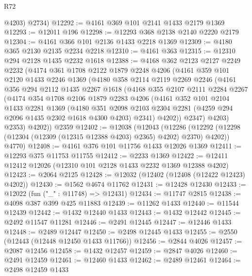 \begin{lexlean}{R72}
\begin{coremodule}
        @4203)
      @2734)
@12292 := @4161 @369 @101 @2141 @1433 @2179 @1369
@12293 := @12011 @196
@12298 := @12293 @368 @2138 @2140 @2220 @2179
@12304 := @4161 @366 @101 @2136 @1433 @2218 @1369
@12309 := @4180 @365 @2130 @2135 @2234 @2218
@12310 := @4161 @363
@12315 := @12310 @294 @2128 @1435 @2232 @1618
@12388 := @4168
    @362
    @2123
    @2127
    @2249
    @2232
    (@4174
      @361
      @1708
      @2122
      @1879
      @2248
      @4206
      (@4161
        @359
        @101
        @2120
        @1433
        @2246
        @1369
        (@4180
          @358
          @2114
          @2119
          @2269
          @2246
          (@4161
            @356
            @294
            @2112
            @1435
            @2267
            @1618
            (@4168
              @355
              @2107
              @2111
              @2284
              @2267
              (@4174
                @354
                @1708
                @2106
                @1879
                @2283
                @4206
                (@4161
                  @352
                  @101
                  @2104
                  @1433
                  @2281
                  @1369
                  (@4180
                    @351
                    @2098
                    @2103
                    @2304
                    @2281
                    (@4259 @294 @2096 @1435 @2302 @1618 @4300 @4203)
                    @2341)
                  @4202))
              @2347)
            @4203)
          @2353)
        @4202))
    @2359
@12402 := @12038
    (@12043
      (@12286 (@12292 (@12298 (@12304 (@12309 (@12315 @12388 @4203) @2365) @4202) @2370) @4202))
      @4770)
@12408 := @4161 @376 @101 @11756 @1433 @12026 @1369
@12411 := @12293 @375 @11753 @11755
@12412 := @2233 @1369
@12422 := @12411 @12412 @12026 (@12310 @101 @2128 @1433 @2232 @1369 @12388 @4202)
@12423 := @2064 @2125
@12428 := @12032 (@12402 (@12408 (@12422 @12423) @4202))
@12430 := @1562 @4674 @11762
@12431 := @12428 @12430
@12433 := @12022 (fun ("_" : @11748) => @12431)
@12434 := @11747 @2815
@12438 := @4098 @387 @399 @425 @11883
@12439 := @11262 @1433
@12440 := @11544 @12439
@12442 := @1432 @12440 @1433
@12443 := @1432 @12442
@12445 := @2492 @11547 @11281
@12446 := @2491 @12445
@12447 := @12446 @1433
@12448 := @2489 @12447
@12450 := @2498 @12445 @1433
@12455 := @2550 (@12443 (@12448 @12450 @1433 @11766))
@12456 := @2844 @4026
@12457 := @2087 @12456
@12458 := @1432 @12457
@12459 := @2847 @4026
@12460 := @2491 @12459
@12461 := @12460 @1433
@12462 := @2489 @12461
@12464 := @2498 @12459 @1433

\end{coremodule}
\end{lexlean}
